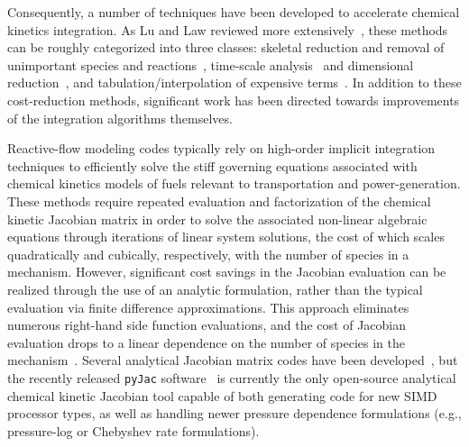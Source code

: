 \documentclass[preprint]{elsarticle}
\begin{document}
Consequently, a number of techniques have been developed to accelerate chemical kinetics integration.
As Lu and Law reviewed more extensively~\cite{Lu:2009gh}, these methods can be roughly categorized into three classes: skeletal reduction and removal of unimportant species and reactions~\cite{vajda_pca,rabitz_sa,turanyi_sa_1,turanyi_sa_2,Lu:2005,Lu:2006bb,valorani_csp,valorani_csp2,Lu:2008bi,Pepiot-Desjardins:2008,Niemeyer:2010bt,Niemeyer:2014,Curtis:2015aa}, time-scale analysis~\cite{qssa,pe_approx1,pe_approx2} and dimensional reduction~\cite{Lam:1988wc,Maas:1992aa,Lam:1993ub,Lam:1994ws,Lu:2001ve}, and tabulation\slash interpolation of expensive terms~\cite{Pope:1997wu,Christo1996,Tonse:1999aa}.
In addition to these cost-reduction methods, significant work has been directed towards improvements of the integration algorithms themselves.

Reactive-flow modeling codes typically rely on high-order implicit integration techniques to efficiently solve the stiff governing equations associated with chemical kinetics models of fuels relevant to transportation and power-generation.
These methods require repeated evaluation and factorization of the chemical kinetic Jacobian matrix in order to solve the associated non-linear algebraic equations through iterations of linear system solutions, the cost of which scales quadratically and cubically, respectively, with the number of species in a mechanism.
However, significant cost savings in the Jacobian evaluation can be realized through the use of an analytic formulation, rather than the typical evaluation via finite difference approximations.
This approach eliminates numerous right-hand side function evaluations, and the cost of Jacobian evaluation drops to a linear dependence on the number of species in the mechanism~\cite{Lu:2009gh}.
Several analytical Jacobian matrix codes have been developed~\cite{Safta:2011vn,Youssefi:2011tm,Bisetti:2012jw,Perini:2012gy,Dijkmans:2014bb}, but the recently released \texttt{pyJac} software~\cite{Niemeyer:2015im,Niemeyer:2015ws} is currently the only open-source analytical chemical kinetic Jacobian tool capable of both generating code for new SIMD processor types, as well as handling newer pressure dependence formulations (e.g., pressure-log or Chebyshev rate formulations).
\end{document}
